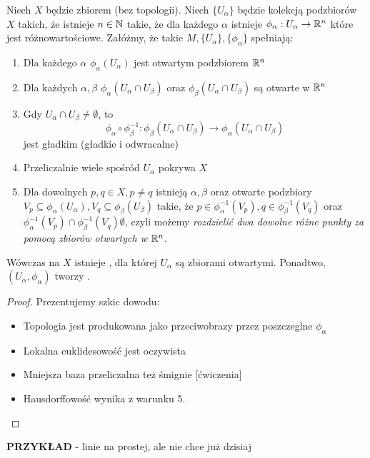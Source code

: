 \begin{lemma}
    Niech $X$ będzie zbiorem (bez topologii). Niech $\{U_\alpha\}$ będzie kolekcją podzbiorów $X$ takich, że istnieje $n\in\mathbb{N}$ takie, że dla każdego $\alpha$ istnieje $\phi_\alpha:U_\alpha\to\mathbb{R}^n$ które jest różnowartościowe. Załóżmy, że takie $M,\{U_\alpha\},\{\phi_\alpha\}$ spełniają:
    \begin{enumerate}
        \item Dla każdego $\alpha$ $\phi_\alpha(U_\alpha)$ jest otwartym podzbiorem $\mathbb{R}^n$
        \item Dla każdych $\alpha,\beta$ $\phi_\alpha(U_\alpha\cap U_\beta)$ oraz $\phi_\beta(U_\alpha\cap U_\beta)$ są otwarte w $\mathbb{R}^n$
        \item Gdy $U_\alpha\cap U_\beta\neq\emptyset$, to 
        $$\phi_\alpha\circ\phi_\beta^{-1}:\phi_\beta(U_\alpha\cap U_\beta)\to\phi_\alpha(U_\alpha\cap U_\beta)$$
        jest gładkim  (gładkie i odwracalne)
        \item Przeliczalnie wiele spośród $U_\alpha$ pokrywa $X$
        \item Dla dowolnych $p,q\in X,p\neq q$ istnieją $\alpha,\beta$ oraz otwarte podzbiory $V_p\subseteq\phi_\alpha(U_\alpha), V_q\subseteq\phi_\beta(U_\beta)$ takie, że $p\in\phi_\alpha^{-1}(V_p),q\in\phi_\beta^{-1}(V_q)$ oraz $\phi_\alpha^{-1}(V_p)\cap\phi_\beta^{-1}(V_q)\emptyset$, czyli możemy \emph{rozdzielić dwa dowolne różne punkty za pomocą zbiorów otwartych w $\mathbb{R}^n$}.
    \end{enumerate}
    Wówczas na $X$ istnieje , dla której $U_\alpha$ są zbiorami otwartymi. Ponadtwo, $(U_\alpha,\phi_\alpha)$ tworzy .
\end{lemma}
\begin{proof}Prezentujemy szkic dowodu:
\begin{itemize}
    \item Topologia jest produkowana jako przeciwobrazy przez poszczeglne $\phi_\alpha$
    \item Lokalna euklidesowość jest oczywista
    \item Mniejsza baza przeliczalna też śmignie [ćwiczenia]
    \item Hausdorffowość wynika z warunku 5.
\end{itemize}
\end{proof}

\textbf{PRZYKŁAD} - linie na prostej, ale nie chce już dzisiaj








